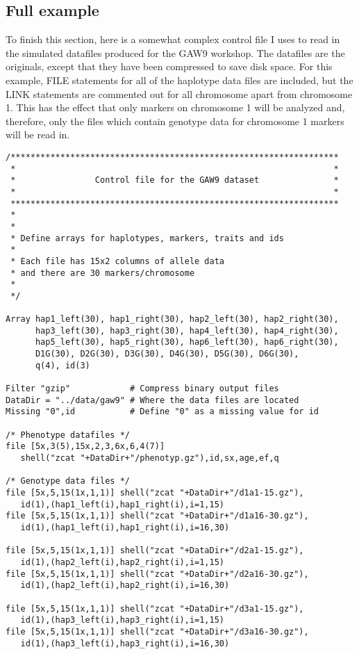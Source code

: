 \documentclass[10pt,a4paper]{article}
\begin{document}
\subsection{Full example}
To finish this section, here is a somewhat complex control file I uses to
read in the simulated datafiles produced for the GAW9 workshop.  The
datafiles are the originals, except that they have been compressed to save
disk space.  For this example, FILE statements for all of the haplotype data
files are included, but the LINK statements are commented out for all
chromosome apart from chromosome 1.  This has the effect that only
markers on chromosome 1 will be analyzed and, therefore, only the files
which contain genotype data for chromosome 1 markers will be read in.
\begin{verbatim}
/******************************************************************
 *                                                                *
 *                Control file for the GAW9 dataset               *
 *                                                                *
 ******************************************************************
 *
 *
 * Define arrays for haplotypes, markers, traits and ids
 *
 * Each file has 15x2 columns of allele data
 * and there are 30 markers/chromosome
 * 
 */

Array hap1_left(30), hap1_right(30), hap2_left(30), hap2_right(30),
      hap3_left(30), hap3_right(30), hap4_left(30), hap4_right(30),
      hap5_left(30), hap5_right(30), hap6_left(30), hap6_right(30),
      D1G(30), D2G(30), D3G(30), D4G(30), D5G(30), D6G(30), 
      q(4), id(3)

Filter "gzip"            # Compress binary output files
DataDir = "../data/gaw9" # Where the data files are located
Missing "0",id           # Define "0" as a missing value for id 

/* Phenotype datafiles */
file [5x,3(5),15x,2,3,6x,6,4(7)] 
   shell("zcat "+DataDir+"/phenotyp.gz"),id,sx,age,ef,q
 
/* Genotype data files */
file [5x,5,15(1x,1,1)] shell("zcat "+DataDir+"/d1a1-15.gz"),
   id(1),(hap1_left(i),hap1_right(i),i=1,15)
file [5x,5,15(1x,1,1)] shell("zcat "+DataDir+"/d1a16-30.gz"),
   id(1),(hap1_left(i),hap1_right(i),i=16,30)

file [5x,5,15(1x,1,1)] shell("zcat "+DataDir+"/d2a1-15.gz"),
   id(1),(hap2_left(i),hap2_right(i),i=1,15)
file [5x,5,15(1x,1,1)] shell("zcat "+DataDir+"/d2a16-30.gz"),
   id(1),(hap2_left(i),hap2_right(i),i=16,30)

file [5x,5,15(1x,1,1)] shell("zcat "+DataDir+"/d3a1-15.gz"),
   id(1),(hap3_left(i),hap3_right(i),i=1,15)
file [5x,5,15(1x,1,1)] shell("zcat "+DataDir+"/d3a16-30.gz"),
   id(1),(hap3_left(i),hap3_right(i),i=16,30)


\end{verbatim}
\end{document}

